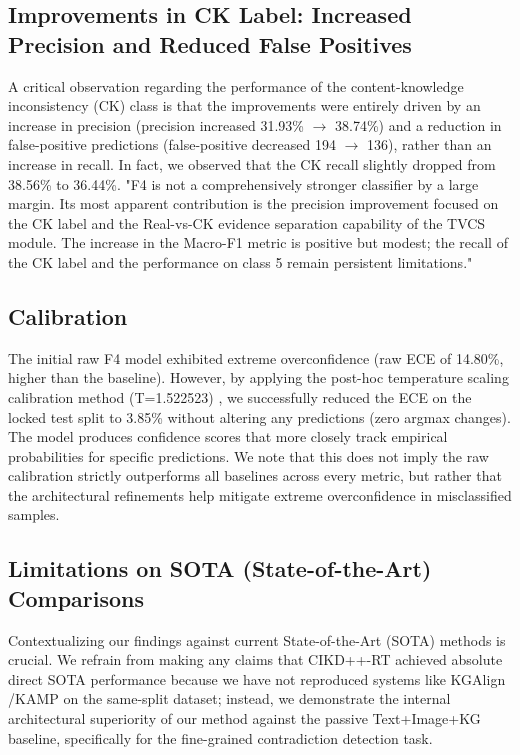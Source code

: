 \subsection{Improvements in CK Label: Increased Precision and Reduced False Positives}
A critical observation regarding the performance of the content-knowledge inconsistency (CK) class is that the improvements were entirely driven by an increase in precision (precision increased 31.93\% $\rightarrow$ 38.74\%) and a reduction in false-positive predictions (false-positive decreased 194 $\rightarrow$ 136), rather than an increase in recall. In fact, we observed that the CK recall slightly dropped from 38.56\% to 36.44\%. "F4 is not a comprehensively stronger classifier by a large margin. Its most apparent contribution is the precision improvement focused on the CK label and the Real-vs-CK evidence separation capability of the TVCS module. The increase in the Macro-F1 metric is positive but modest; the recall of the CK label and the performance on class 5 remain persistent limitations."

\subsection{Calibration}
The initial raw F4 model exhibited extreme overconfidence (raw ECE of 14.80\%, higher than the baseline). However, by applying the post-hoc temperature scaling calibration method (T=1.522523) \cite{ref10}, we successfully reduced the ECE on the locked test split to 3.85\% without altering any predictions (zero argmax changes). The model produces confidence scores that more closely track empirical probabilities for specific predictions. We note that this does not imply the raw calibration strictly outperforms all baselines across every metric, but rather that the architectural refinements help mitigate extreme overconfidence \cite{ref45} in misclassified samples.

\subsection{Limitations on SOTA (State-of-the-Art) Comparisons}
Contextualizing our findings against current State-of-the-Art (SOTA) methods is crucial. We refrain from making any claims that CIKD++-RT achieved absolute direct SOTA performance because we have not reproduced systems like KGAlign \cite{ref46}/KAMP \cite{ref47} on the same-split dataset; instead, we demonstrate the internal architectural superiority of our method against the passive Text+Image+KG baseline, specifically for the fine-grained contradiction detection task.

